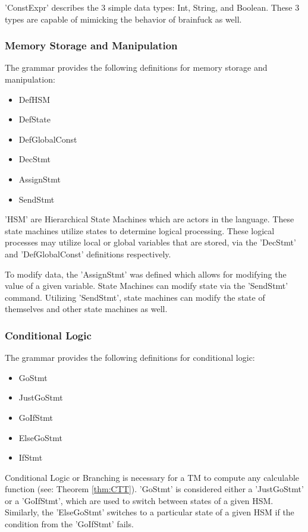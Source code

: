 'ConstExpr' describes the 3 simple data types: Int, String, and Boolean.
These 3 types are capable of mimicking the behavior of brainfuck as well.

\subsubsection{Memory Storage and Manipulation}\label{subsubsec:MemStoManip}

The grammar provides the following definitions for memory storage and manipulation:
\begin{itemize}
    \item DefHSM
    \item DefState
    \item DefGlobalConst
    \item DecStmt
    \item AssignStmt
    \item SendStmt
\end{itemize}

'HSM' are Hierarchical State Machines which are actors in the language.
These state machines utilize states to determine logical processing.
These logical processes may utilize local or global variables that are stored, via the 'DecStmt' and 'DefGlobalConst' definitions respectively.

To modify data, the 'AssignStmt' was defined which allows for modifying the value of a given variable.
State Machines can modify state via the 'SendStmt' command.
Utilizing 'SendStmt', state machines can modify the state of themselves and other state machines as well.

\subsubsection{Conditional Logic}\label{subsubsec:CondLog}

The grammar provides the following definitions for conditional logic:
\begin{itemize}
    \item GoStmt
    \item JustGoStmt
    \item GoIfStmt
    \item ElseGoStmt
    \item IfStmt
\end{itemize}

Conditional Logic or Branching is necessary for a TM to compute any calculable function (see: Theorem \ref{thm:CTT}).
'GoStmt' is considered either a 'JustGoStmt' or a 'GoIfStmt', which are used to switch between states of a given HSM.
Similarly, the 'ElseGoStmt' switches to a particular state of a given HSM if the condition from the 'GoIfStmt' fails.

